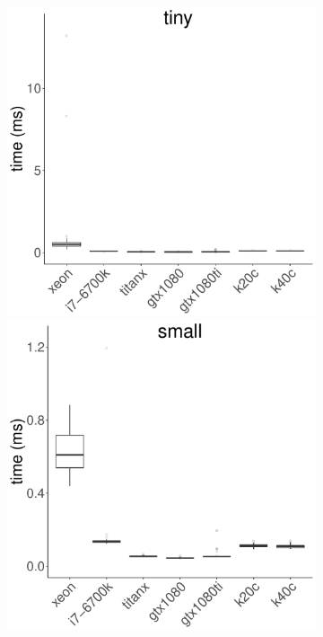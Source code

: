 \documentclass[../document.tex]{subfiles}
\begin{document}
\begin{figure}
	\begin{subfigure}{0.09\textwidth} \label{fig:time-srad} \vspace{5mm}\end{subfigure}
	\begin{subfigure}{0.9\textwidth}
		\includegraphics[width=\plotwidth]{figures/time-results/generate_srad_tiny_boxplot-1}
		\includegraphics[width=\plotwidth]{figures/time-results/generate_srad_small_boxplot-1}

\end{subfigure}
\end{figure}
\end{document}
